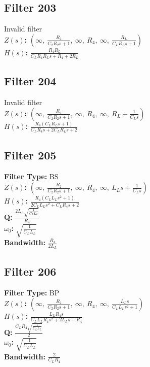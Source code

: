 \documentclass{article}
\begin{document}
\subsection*{Filter 203}
Invalid filter \\ 
\textbf{$Z(s)$:} $\left( \infty, \  \frac{R_{2}}{C_{2} R_{2} s + 1}, \  \infty, \  R_{4}, \  \infty, \  \frac{R_{L}}{C_{L} R_{L} s + 1}\right)$ \\ 
\textbf{$H(s)$:} $\frac{R_{4} R_{L}}{C_{L} R_{4} R_{L} s + R_{4} + 2 R_{L}}$ \\ 
\subsection*{Filter 204}
Invalid filter \\ 
\textbf{$Z(s)$:} $\left( \infty, \  \frac{R_{2}}{C_{2} R_{2} s + 1}, \  \infty, \  R_{4}, \  \infty, \  R_{L} + \frac{1}{C_{L} s}\right)$ \\ 
\textbf{$H(s)$:} $\frac{R_{4} \left(C_{L} R_{L} s + 1\right)}{C_{L} R_{4} s + 2 C_{L} R_{L} s + 2}$ \\ 
\subsection*{Filter 205}
\textbf{Filter Type:} BS \\ 
\textbf{$Z(s)$:} $\left( \infty, \  \frac{R_{2}}{C_{2} R_{2} s + 1}, \  \infty, \  R_{4}, \  \infty, \  L_{L} s + \frac{1}{C_{L} s}\right)$ \\ 
\textbf{$H(s)$:} $\frac{R_{4} \left(C_{L} L_{L} s^{2} + 1\right)}{2 C_{L} L_{L} s^{2} + C_{L} R_{4} s + 2}$ \\ 
\textbf{Q:} $\frac{2 L_{L} \sqrt{\frac{1}{C_{L} L_{L}}}}{R_{4}}$ \\ 
\textbf{$\omega_0$:} $\sqrt{\frac{1}{C_{L} L_{L}}}$ \\ 
\textbf{Bandwidth:} $\frac{R_{4}}{2 L_{L}}$ \\ 
\subsection*{Filter 206}
\textbf{Filter Type:} BP \\ 
\textbf{$Z(s)$:} $\left( \infty, \  \frac{R_{2}}{C_{2} R_{2} s + 1}, \  \infty, \  R_{4}, \  \infty, \  \frac{L_{L} s}{C_{L} L_{L} s^{2} + 1}\right)$ \\ 
\textbf{$H(s)$:} $\frac{L_{L} R_{4} s}{C_{L} L_{L} R_{4} s^{2} + 2 L_{L} s + R_{4}}$ \\ 
\textbf{Q:} $\frac{C_{L} R_{4} \sqrt{\frac{1}{C_{L} L_{L}}}}{2}$ \\ 
\textbf{$\omega_0$:} $\sqrt{\frac{1}{C_{L} L_{L}}}$ \\ 
\textbf{Bandwidth:} $\frac{2}{C_{L} R_{4}}$ \\ 
\end{document}
